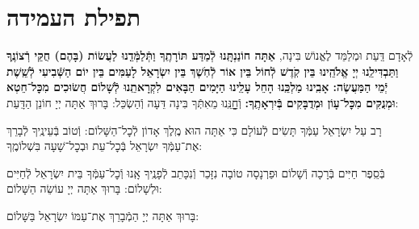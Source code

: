 \documentclass[twoside, openany, parskip=half, 11pt]{book}
\begin{document}
\emesveemuna

\hashkiveinu

\boruchhashemleolam

\yerueinnu

\halfkaddish

\section*{ תפילת העמידה }

\amidaopening{\ayt}{}

\weekdaysakiddushhashem

לְֿאָדָם דַּֽעַת וּמְלַמֵּד לֶאֱנוֹשׁ בִּינָה,
\textbf{
אַתָּה חוֹנַנְתָּֽנוּ לְֿמַדַּע תּוֹרָתֶֽךָ וַתְּֿלַמְּֿדֵֽנוּ לַעֲשׂוֹת (בָּהֶם) חֻקֵּי רְֿצוֹנֶֽךָ וַתַּבְדִּילֵֽנוּ יְיָ אֱלֹהֵֽינוּ בֵּין קֹֽדֶשׁ לְֿחוֹל בֵּין אוֹר לְֿחֹֽשֶׁךְ בֵּין יִשְׂרָאֵל לָעַמִּים בֵּין יוֹם הַשְּֿׁבִיעִי לְֿשֵֽׁשֶׁת יְֿמֵי הַמַּעֲשֶׂה: אָבִֽינוּ מַלְכֵּֽנוּ הָחֵל עָלֵֽינוּ הַיָּמִים הַבָּאִים לִקְרָאתֵֽנוּ לְֿשָׁלוֹם חֲשׂוּכִים מִכׇּל־חֵטְא וּמְנֻקִּים מִכׇּל־עָוֹן וּמְדֻבָּקִים בְּֿיִרְאָתֶֽךָ:
}
וְֿחׇׇׇׇָנֵּֽנוּ מֵאִתְּֿךָ בִּינָה דֵּעָה וְֿהַשְׂכֵּל: בָּרוּךְ אַתָּה יְיָ חוֹנֵן הַדָּֽעַת:

\weekdaysateshuva

\weekdaysaselichah

\weekdaysageulah

\weekdaysarefuah

\weekdaysaberacha

\weekdaysashofar

\weekdaysamishpat

\weekdaysaminim

\weekdaysatzadikim

\weekdaysayerushelayim

\weekdaysamalchus

\weekdaysashemakoleinu

\retzeh

\yaalehveyavo

\zion

\maarivmodim

\alhanisim

\weekdaysahodos



רָב עַל יִשְׂרָאֵל עַמְּֿךָ תָּשִׂים לְֿעוֹלָם כִּי אַתָּה הוּא מֶֽלֶךְ אָדוֹן לְֿכׇל־הַשָּׁלוֹם:
וְֿטוֹב בְּֿעֵינֶֽיךָ לְֿבָרֵךְ אֶת־עַמְּֿךָ יִשְׂרָאֵל בְּֿכׇל־עֵת וּבְכׇל־שָׁעָה בִּשְׁלוֹמֶֽךָ:
\vspace{-0.4\baselineskip}
\begin{paracol}{2}

\begin{small}
בְּֿסֵֽפֶר חַיִּים בְּֿרָכָה וְֿשָׁלוֹם וּפַרְנָסָה טוֹבָה נִזָּכֵר וְֿנִכָּתֵב לְֿפָנֶֽיךָ אָֽנוּ וְֿכׇל־עַמְּֿךָ בֵּית יִשְׂרָאֵל לְֿחַיִּים וּלְשָׁלוֹם: בָּרוּךְ אַתָּה יְיָ עוֹשֵׂה הַשָּׁלוֹם:
\end{small}
\switchcolumn
בָּרוּךְ אַתָּה יְיָ הַמְֿבָרֵךְ אֶת־עַמּוֹ יִשְׂרָאֵל בַּשָּׁלוֹם:
\end{paracol}
\end{document}
